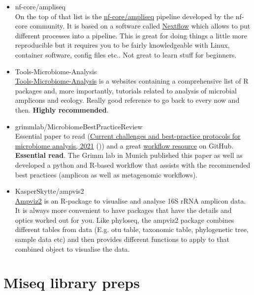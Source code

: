 \documentclass[
]{book}
\begin{document}
\begin{itemize}
\item
  nf-core/ampliseq\\
  On the top of that list is the \href{https://github.com/topics/amplicon-sequencing}{nf-core/ampliseq} pipeline developed by the nf-core community. It is based on a software called \href{https://www.nextflow.io/}{Nextflow} which allows to put different processes into a pipeline. This is great for doing things a little more reproducible but it requires you to be fairly knowledgeable with Linux, container software, config files etc.. Not great to learn stuff for beginners.
\item
  Tools-Microbiome-Analysis\\
  \href{https://microsud.github.io/Tools-Microbiome-Analysis/}{Tools-Microbiome-Analysis} is a websites containing a comprehensive list of R packages and, more importantly, tutorials related to analysis of microbial amplicons and ecology. Really good reference to go back to every now and then. \textbf{Highly recommended}.
\item
  grimmlab/MicrobiomeBestPracticeReview\\
  Essential paper to read (\href{https://academic.oup.com/bib/article/22/1/178/5678919}{Current challenges and best-practice protocols for microbiome analysis, 2021} (\citet{Bharti2021})) and a great \href{https://github.com/grimmlab/MicrobiomeBestPracticeReview}{workflow resource} on GitHub. \textbf{Essential read}. The Grimm lab in Munich published this paper as well as developed a python and R-based workflow that assists with the recommended best practices (amplicon as well as metagenomic workflows).
\item
  KasperSkytte/ampvis2\\
  \href{https://kasperskytte.github.io/ampvis2/articles/ampvis2.html}{Ampviz2} is an R-package to visualise and analyse 16S rRNA amplicon data. It is always more convenient to have packages that have the details and optics worked out for you. Like phyloseq, the ampviz2 package combines different tables from data (E.g. otu table, taxonomic table, phylogenetic tree, sample data etc) and then provides different functions to apply to that combined object to visualise the data.
\end{itemize}

\hypertarget{miseq-library-preps}{%
\chapter{Miseq library preps}\label{miseq-library-preps}}
\end{document}
